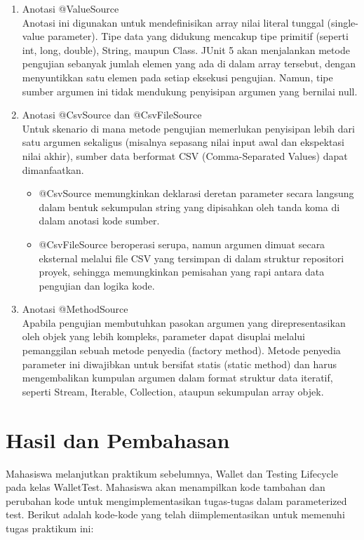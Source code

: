 \documentclass[a4paper,12pt]{article}
\begin{document}
\begin{enumerate}
    \item Anotasi @ValueSource\\
    Anotasi ini digunakan untuk mendefinisikan array nilai literal tunggal (single-value parameter). Tipe data yang didukung mencakup tipe primitif (seperti int, long, double), String, maupun Class. JUnit 5 akan menjalankan metode pengujian sebanyak jumlah elemen yang ada di dalam array tersebut, dengan menyuntikkan satu elemen pada setiap eksekusi pengujian. Namun, tipe sumber argumen ini tidak mendukung penyisipan argumen yang bernilai null.

    \item Anotasi @CsvSource dan @CsvFileSource\\
    Untuk skenario di mana metode pengujian memerlukan penyisipan lebih dari satu argumen sekaligus (misalnya sepasang nilai input awal dan ekspektasi nilai akhir), sumber data berformat CSV (Comma-Separated Values) dapat dimanfaatkan.
    \begin{itemize}
        \item @CsvSource memungkinkan deklarasi deretan parameter secara langsung dalam bentuk sekumpulan string yang dipisahkan oleh tanda koma di dalam anotasi kode sumber.
        \item @CsvFileSource beroperasi serupa, namun argumen dimuat secara eksternal melalui file CSV yang tersimpan di dalam struktur repositori proyek, sehingga memungkinkan pemisahan yang rapi antara data pengujian dan logika kode.
    \end{itemize}

    \item Anotasi @MethodSource\\
    Apabila pengujian membutuhkan pasokan argumen yang direpresentasikan oleh objek yang lebih kompleks, parameter dapat disuplai melalui pemanggilan sebuah metode penyedia (factory method). Metode penyedia parameter ini diwajibkan untuk bersifat statis (static method) dan harus mengembalikan kumpulan argumen dalam format struktur data iteratif, seperti Stream, Iterable, Collection, ataupun sekumpulan array objek.
\end{enumerate}

\section{Hasil dan Pembahasan}
Mahasiswa melanjutkan praktikum sebelumnya, Wallet dan Testing Lifecycle pada kelas WalletTest. Mahasiswa akan menampilkan kode tambahan dan perubahan kode untuk mengimplementasikan tugas-tugas dalam parameterized test. Berikut adalah kode-kode yang telah diimplementasikan untuk memenuhi tugas praktikum ini:
\end{document}
